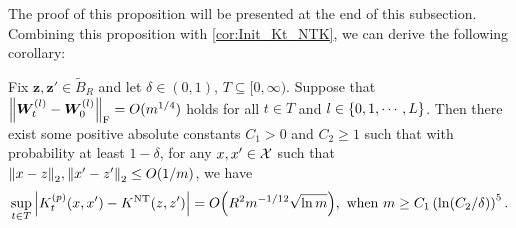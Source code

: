 The proof of this proposition will be presented at the end of this subsection.
Combining this proposition with \cref{cor:Init_Kt_NTK}, we can derive the following corollary:
\begin{corollary}
  \label{cor:Training_Kernel_uniform}
  Fix $ \bm{z},\bm{z}' \in \tilde{B}_R$ and let $\delta\in(0,1)$, $T\subseteq[0,\infty)$.
  Suppose that $\norm{\bm{W}^{(l)}_t - \bm{W}^{(l)}_0}_{\mathrm{F}}= O(m^{1/4})$ holds for all $t\in T$ and $l\in\left\{0,1,\cdots,L\right\}$.
  Then there exist some positive absolute constants $C_1>0$ and $C_2\geq 1$ such that with probability at least $1 - \delta$, for any $x,x' \in \mathcal{\bm{X}}$ such that $\norm{x-z}_2,\norm{x'-z'}_2 \leq O( 1/m)$, we have
  \[\sup_{t\in T}\abs{K^{(p)}_t(\x,\x') - \NTK(\z,\z')}= O \xkm{R^2 m^{-{1}/{12}}\sqrt{\ln m}},~\text{when}~m\geq C_1\xk{\ln(C_2/\delta)}^5.\]
\end{corollary}




